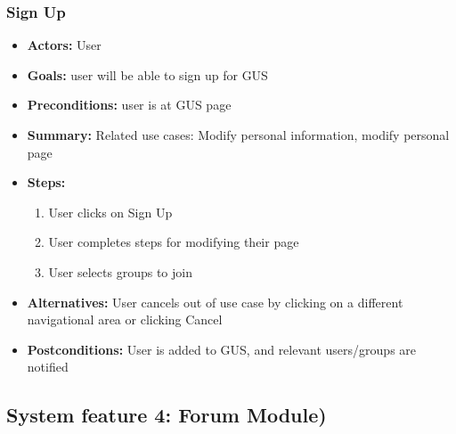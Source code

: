 \documentclass[12pt, oneside, letterpaper]{report}
\begin{document}
			\subsubsection{Sign Up}
			\begin{itemize}
				\item{\textbf{Actors:} User}
				\item{\textbf{Goals:} user will be able to sign up for GUS}
				\item{\textbf{Preconditions:} user is at GUS page}
				\item{\textbf{Summary:} Related use cases: Modify personal information, modify personal page}
				\item{\textbf{Steps:}
				\begin{enumerate}
					\item{User clicks on Sign Up}
					\item{User completes steps for modifying their page}
					\item{User selects groups to join}
				\end{enumerate}
				}
				\item{\textbf{Alternatives:} User cancels out of use case by clicking on a different navigational area or clicking Cancel}
				\item{\textbf{Postconditions:} User is added to GUS, and relevant users/groups are notified}
			\end{itemize}

			\subsection{System feature 4: Forum Module)}
\end{document}
